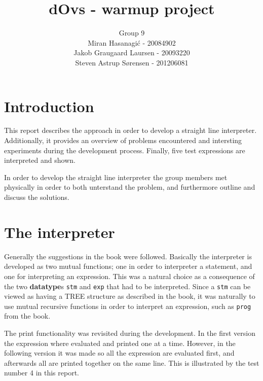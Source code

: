 \documentclass[a4paper]{article}
\title{dOvs - warmup project}
\author{
  Group 9 \\
  Miran Hasanagi\'{c} - 20084902 \\
  Jakob Graugaard Laursen - 20093220\\
  Steven Astrup S\o rensen - 201206081
}
\begin{document}
\maketitle

\section{Introduction}

This report describes the approach in order to develop a straight line interpreter. Additionally, it provides an overview of problems encountered and intersting experiments during the development process. Finally, five test expressions are interpreted and shown.

In order to develop the straight line interpreter the group members met physically in order to both unterstand the problem, and furthermore outline and discuss the solutions.

\section{The interpreter}

Generally the suggestions in the book were followed. Basically the interpreter is developed as two mutual functions; one in order to interpreter a statement, and one for interpreting an expression. This was a natural choice as a consequence of the two \textbf{datatype}s \texttt{stm} and \texttt{exp} that had to be interpreted. Since a \texttt{stm} can be viewed as having a TREE structure as described in the book, it was naturally to use mutual recursive functions in order to interpret an expression, such as \texttt{prog} from the book.

The print functionality was revisited during the development. In the first version the expression where evaluated and printed one at a time. However, in the following version it was made so all the expression are evaluated first, and afterwards all are printed together on the same line. This is illustrated by the test number 4 in this report.

\end{document}
